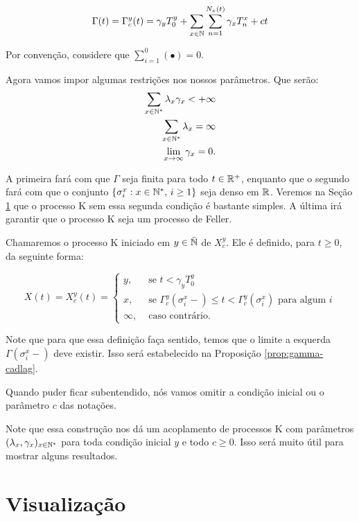 \begin{equation}
  \label{def:Gamma}
  \Gamma(t) = \Gamma^y_c (t) = \gamma_y T_0^y
  + \sum_{x \in {\mathbb{N}}} \sum_{n = 1}^{N_x(t)}
  \gamma_x T_n^x
  + ct
\end{equation}

Por convenção, considere que $\sum_{i=1}^{0}( \bullet ) = 0$.

Agora vamos impor algumas restrições nos nossos parâmetros. Que serão:
\begin{align}
  \sum_{x \in {\mathbb{N^*}}} \lambda_x\gamma_x < +\infty\\
  \sum_{x \in {\mathbb{N^*}}} \lambda_x = \infty\\
  \lim_{x \to \infty} \gamma_x = 0.
\end{align}

A primeira fará com que $\Gamma$ seja \qc finita para todo $t \in
{\mathbb{R}}^+$, enquanto que o segundo fará com que o conjunto $\{\sigma^x_i: x
\in {\mathbb{N^*}}, \, i \geq 1\}$ seja denso em ${\mathbb{R}}$. Veremos na Seção
\ref{sec:visualizacao} que o processo K sem essa segunda condição é
bastante simples. A última irá garantir que o processo K seja um
processo de Feller.

Chamaremos o processo K iniciado em $y \in {\bar{{\mathbb{N}}}}$ de $X^y_c$. Ele é
definido, para $t \geq 0$, da seguinte forma:

\begin{equation}
  \label{def:procK}
  X(t) = X^y_c (t) =
  \begin{cases}
    y, & \textrm{ se }  t < \gamma_y T_0^y\\
    x, & \textrm{ se } \Gamma^y_c(\sigma_i^x-) \leq t <
    \Gamma^y_c(\sigma^x_i)
    \textrm{ para algum } i \\
    \infty, & \textrm{ caso contrário.}
  \end{cases}
\end{equation}

Note que para que essa definição faça sentido, temos que o limite a
esquerda $\Gamma (\sigma_i^x-)$ deve existir. Isso será estabelecido
na Proposição \ref{prop:gamma-cadlag}.

Quando puder ficar subentendido, nós vamos omitir a condição inicial
ou o parâmetro $c$ das notações.

Note que essa construção nos dá um acoplamento de processos K com
parâmetros $(\lambda_x, \gamma_x)_{x \in {\mathbb{N^*}}}$ para toda condição
inicial $y$ e todo $c \geq 0$. Isso será muito útil para mostrar
alguns resultados.



\section{Visualização}
\label{sec:visualizacao}

